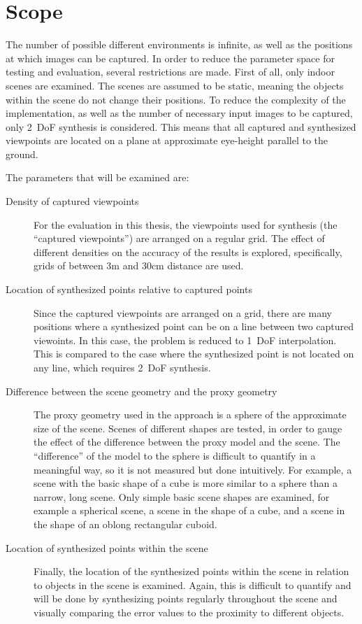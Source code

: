 \section*{Scope}
The number of possible different environments is infinite, as well as the positions at which images can be captured. In order to reduce the parameter space for testing and evaluation, several restrictions are made. First of all, only indoor scenes are examined. The scenes are assumed to be static, meaning the objects within the scene do not change their positions. To reduce the complexity of the implementation, as well as the number of necessary input images to be captured, only 2~DoF synthesis is considered. This means that all captured and synthesized viewpoints are located on a plane at approximate eye-height parallel to the ground. 


The parameters that will be examined are:
\begin{description}
  \item[Density of captured viewpoints] For the evaluation in this thesis, the viewpoints used for synthesis (the ``captured viewpoints'') are arranged on a regular grid. The effect of different densities on the accuracy of the results is explored, specifically, grids of between 3m and 30cm distance are used.
  \item[Location of synthesized points relative to captured points] Since the captured viewpoints are arranged on a grid, there are many positions where a synthesized point can be on a line between two captured viewoints. In this case, the problem is reduced to 1~DoF interpolation. This is compared to the case where the synthesized point is not located on any line, which requires 2~DoF synthesis.
  \item[Difference between the scene geometry and the proxy geometry] The proxy geometry used in the approach is a sphere of the approximate size of the scene. Scenes of different shapes are tested, in order to gauge the effect of the difference between the proxy model and the scene. The ``difference'' of the model to the sphere is difficult to quantify in a meaningful way, so it is not measured but done intuitively. For example, a scene with the basic shape of a cube is more similar to a sphere than a narrow, long scene. Only simple basic scene shapes are examined, for example a spherical scene, a scene in the shape of a cube, and a scene in the shape of an oblong rectangular cuboid.
  \item[Location of synthesized points within the scene] Finally, the location of the synthesized points within the scene in relation to objects in the scene is examined. Again, this is difficult to quantify and will be done by synthesizing points regularly throughout the scene and visually comparing the error values to the proximity to different objects.
\end{description}

